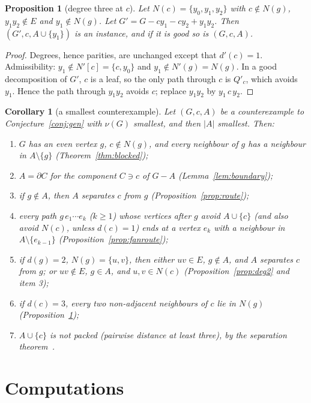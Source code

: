 \documentclass[11pt]{amsart}
\newtheorem{proposition}[theorem]{Proposition}
\newtheorem{corollary}[theorem]{Corollary}
\theoremstyle{definition}
\begin{document}
\begin{proposition}[degree three at $c$]\label{prop:deg3}
Let $N(c)=\{y_0,y_1,y_2\}$ with $c\notin N(g)$, $y_1y_2\notin E$ and $y_1\notin N(g)$. Let
$G'=G-cy_1-cy_2+y_1y_2$. Then $(G',c,A\cup\{y_1\})$ is an instance, and if it is good so is $(G,c,A)$.
\end{proposition}

\begin{proof}
Degrees, hence parities, are unchanged except that $d'(c)=1$. Admissibility: $y_1\notin N'[c]=\{c,y_0\}$
and $y_1\notin N'(g)=N(g)$. In a good decomposition of $G'$, $c$ is a leaf, so the only path through
$c$ is $Q'_c$, which avoids $y_1$. Hence the path through $y_1y_2$ avoids $c$; replace $y_1y_2$ by
$y_1\,c\,y_2$.
\end{proof}

\begin{corollary}[a smallest counterexample]\label{cor:mincex}
Let $(G,c,A)$ be a counterexample to Conjecture~\ref{conj:gen} with $\nu(G)$ smallest, and then $|A|$
smallest. Then:
\begin{enumerate}
\item $G$ has an even vertex $g$, $c\notin N(g)$, and every neighbour of $g$ has a neighbour in
$A\setminus\{g\}$ (Theorem~\ref{thm:blocked});
\item $A=\partial C$ for the component $C\ni c$ of $G-A$ (Lemma~\ref{lem:boundary});
\item if $g\notin A$, then $A$ separates $c$ from $g$ (Proposition~\ref{prop:route});
\item every path $g\,e_1\cdots e_k$ ($k\ge1$) whose vertices after $g$ avoid $A\cup\{c\}$ (and
also avoid $N(c)$, unless $d(c)=1$) ends at a vertex $e_k$ with a neighbour in $A\setminus\{e_{k-1}\}$
(Proposition~\ref{prop:fanroute});
\item if $d(g)=2$, $N(g)=\{u,v\}$, then either $uv\in E$, $g\notin A$, and $A$ separates $c$ from
$g$; or $uv\notin E$, $g\in A$, and $u,v\in N(c)$ (Proposition~\ref{prop:deg2} and item 3);
\item if $d(c)=3$, every two non-adjacent neighbours of $c$ lie in $N(g)$
(Proposition~\ref{prop:deg3});
\item $A\cup\{c\}$ is not packed (pairwise distance at least three), by the separation
theorem~\cite[Theorem~6.1]{RD}.
\end{enumerate}
\end{corollary}

\section{Computations}\label{sec:comp}
\end{document}
